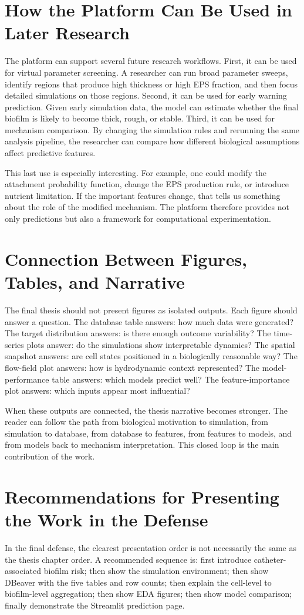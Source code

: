 \documentclass[12pt,a4paper,oneside]{report}
\begin{document}
\section{How the Platform Can Be Used in Later Research}
The platform can support several future research workflows. First, it can be used for virtual parameter screening. A researcher can run broad parameter sweeps, identify regions that produce high thickness or high EPS fraction, and then focus detailed simulations on those regions. Second, it can be used for early warning prediction. Given early simulation data, the model can estimate whether the final biofilm is likely to become thick, rough, or stable. Third, it can be used for mechanism comparison. By changing the simulation rules and rerunning the same analysis pipeline, the researcher can compare how different biological assumptions affect predictive features.

This last use is especially interesting. For example, one could modify the attachment probability function, change the EPS production rule, or introduce nutrient limitation. If the important features change, that tells us something about the role of the modified mechanism. The platform therefore provides not only predictions but also a framework for computational experimentation.

\section{Connection Between Figures, Tables, and Narrative}
The final thesis should not present figures as isolated outputs. Each figure should answer a question. The database table answers: how much data were generated? The target distribution answers: is there enough outcome variability? The time-series plots answer: do the simulations show interpretable dynamics? The spatial snapshot answers: are cell states positioned in a biologically reasonable way? The flow-field plot answers: how is hydrodynamic context represented? The model-performance table answers: which models predict well? The feature-importance plot answers: which inputs appear most influential?

When these outputs are connected, the thesis narrative becomes stronger. The reader can follow the path from biological motivation to simulation, from simulation to database, from database to features, from features to models, and from models back to mechanism interpretation. This closed loop is the main contribution of the work.

\section{Recommendations for Presenting the Work in the Defense}
In the final defense, the clearest presentation order is not necessarily the same as the thesis chapter order. A recommended sequence is: first introduce catheter-associated biofilm risk; then show the simulation environment; then show DBeaver with the five tables and row counts; then explain the cell-level to biofilm-level aggregation; then show EDA figures; then show model comparison; finally demonstrate the Streamlit prediction page.
\end{document}
